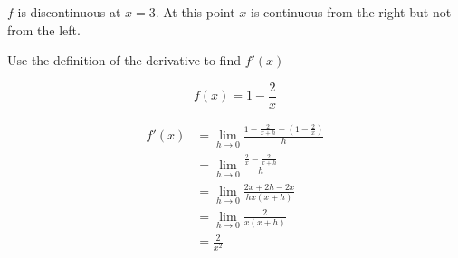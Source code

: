 \documentclass[letterpaper, landscape]{exam}
\begin{document}
\begin{questions}
\begin{solution}
        $f$ is discontinuous at $x = 3$. At this point $x$ is continuous from the right
        but not from the left.

      \end{solution}



      \ifprintanswers
        \newpage
      \fi

      \question[10] Use the definition of the derivative to find $f'(x)$

      \label{derivative:last}
      \[
        f(x) = 1 - \frac{2}{x}
      \]

      \begin{solution}
        \begin{align*}
          f'(x) & = \lim_{h \to 0} \frac{1 - \frac{2}{x + h} - \left( 1 - \frac{2}{x} \right)}{h} \\
                &= \lim_{h \to 0} \frac{\frac{2}{x} - \frac{2}{x+h}}{h} \\
                &= \lim_{h \to 0} \frac{2x + 2h - 2x}{hx(x + h)} \\
                &= \lim_{h \to 0} \frac{2}{x(x + h)} \\
                &= \boxed{ \frac{2}{x^2} } \\
        \end{align*}
      \end{solution}
      
      \ifprintanswers
        \newpage
      \fi


\end{questions}
\end{document}
